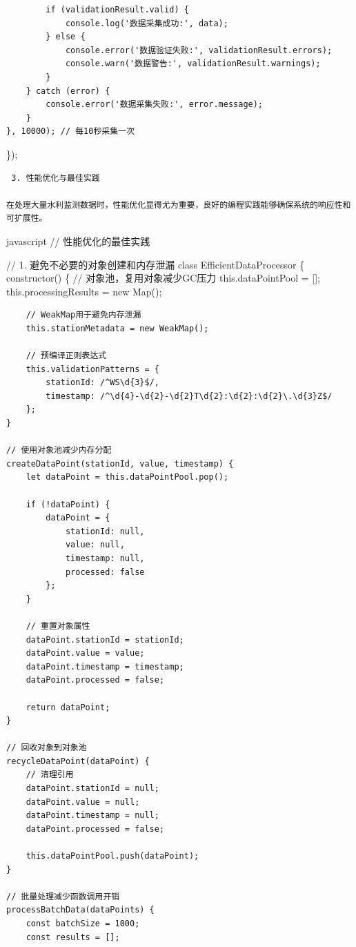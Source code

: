 {{\begin{verbatim}
        if (validationResult.valid) {
            console.log('数据采集成功:', data);
        } else {
            console.error('数据验证失败:', validationResult.errors);
            console.warn('数据警告:', validationResult.warnings);
        }
    } catch (error) {
        console.error('数据采集失败:', error.message);
    }
}, 10000); // 每10秒采集一次
\end{verbatim}

\});

\begin{lstlisting}
 3. 性能优化与最佳实践

在处理大量水利监测数据时，性能优化显得尤为重要，良好的编程实践能够确保系统的响应性和可扩展性。
\end{lstlisting}

javascript // 性能优化的最佳实践

// 1. 避免不必要的对象创建和内存泄漏 class EfficientDataProcessor \{ constructor() \{ // 对象池，复用对象减少GC压力 this.dataPointPool = {[}{]}; this.processingResults = new Map();

\begin{verbatim}
    // WeakMap用于避免内存泄漏
    this.stationMetadata = new WeakMap();
    
    // 预编译正则表达式
    this.validationPatterns = {
        stationId: /^WS\d{3}$/,
        timestamp: /^\d{4}-\d{2}-\d{2}T\d{2}:\d{2}:\d{2}\.\d{3}Z$/
    };
}

// 使用对象池减少内存分配
createDataPoint(stationId, value, timestamp) {
    let dataPoint = this.dataPointPool.pop();
    
    if (!dataPoint) {
        dataPoint = {
            stationId: null,
            value: null,
            timestamp: null,
            processed: false
        };
    }
    
    // 重置对象属性
    dataPoint.stationId = stationId;
    dataPoint.value = value;
    dataPoint.timestamp = timestamp;
    dataPoint.processed = false;
    
    return dataPoint;
}

// 回收对象到对象池
recycleDataPoint(dataPoint) {
    // 清理引用
    dataPoint.stationId = null;
    dataPoint.value = null;
    dataPoint.timestamp = null;
    dataPoint.processed = false;
    
    this.dataPointPool.push(dataPoint);
}

// 批量处理减少函数调用开销
processBatchData(dataPoints) {
    const batchSize = 1000;
    const results = [];
    

\end{verbatim}}}
